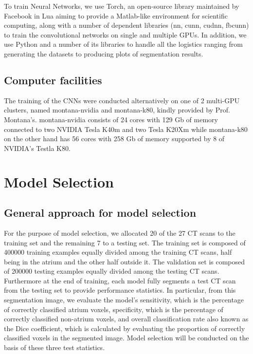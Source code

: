 \noindent To train Neural Networks, we use Torch, an open-source library maintained by Facebook in Lua aiming to provide a Matlab-like environment for scientific computing, along with a number of dependent libraries (nn, cunn, cudnn, fbcunn) to train the convolutional networks on single and multiple GPUs. In addition, we use Python and a number of its libraries to handle all the logistics ranging from generating the datasets to producing plots of segmentation results.

\subsection{Computer facilities}

\noindent The training of the CNNs were conducted alternatively on one of 2 multi-GPU clusters, named montana-nvidia and montana-k80, kindly provided by Prof. Montana's. montana-nvidia consists of 24 cores with 129 Gb of memory connected to two NVIDIA Tesla K40m and two Tesla K20Xm while montana-k80 on the other hand has 56 cores with 258 Gb of memory supported by 8 of NVIDIA's Testla K80. 

\section{Model Selection}

\subsection{General approach for model selection}

\noindent For the purpose of model selection, we allocated 20 of the 27 CT scans to the training set and the remaining 7 to a testing set. The training set is composed of 400000 training examples equally divided among the training CT scans, half being in the atrium and the other half outside it. The validation set is composed of 200000 testing examples equally divided among the testing CT scans. Furthermore at the end of training, each model fully segments a test CT scan from the testing set to provide performance statistics. In particular, from this segmentation image, we evaluate the model's sensitivity, which is the percentage of correctly classified atrium voxels, specificity, which is the percentage of correctly classified non-atrium voxels, and overall classification rate also known as the Dice coefficient, which is calculated by evaluating the proportion of correctly classified voxels in the segmented image. Model selection will be conducted on the basis of these three test statistics.

